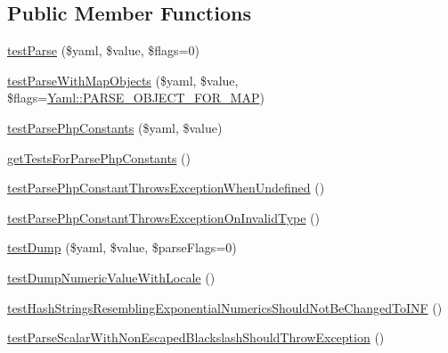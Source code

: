 \subsection*{Public Member Functions}
\begin{DoxyCompactItemize}
\item 
\mbox{\hyperlink{class_symfony_1_1_component_1_1_yaml_1_1_tests_1_1_inline_test_ae32a4636dc7d2dda4a5d4baa0b205292}{test\+Parse}} (\$yaml, \$value, \$flags=0)
\item 
\mbox{\hyperlink{class_symfony_1_1_component_1_1_yaml_1_1_tests_1_1_inline_test_a441ba08e95d784de90a90af091c5c3ba}{test\+Parse\+With\+Map\+Objects}} (\$yaml, \$value, \$flags=\mbox{\hyperlink{class_symfony_1_1_component_1_1_yaml_1_1_yaml_a570a6d9877bcb0c9eaffeb0f046e04b0}{Yaml\+::\+P\+A\+R\+S\+E\+\_\+\+O\+B\+J\+E\+C\+T\+\_\+\+F\+O\+R\+\_\+\+M\+AP}})
\item 
\mbox{\hyperlink{class_symfony_1_1_component_1_1_yaml_1_1_tests_1_1_inline_test_ae6e0682eb91d703b45b24ea4e1bef07c}{test\+Parse\+Php\+Constants}} (\$yaml, \$value)
\item 
\mbox{\hyperlink{class_symfony_1_1_component_1_1_yaml_1_1_tests_1_1_inline_test_a06b6e4fc4d95ccdc8c4cb011d243bfd2}{get\+Tests\+For\+Parse\+Php\+Constants}} ()
\item 
\mbox{\hyperlink{class_symfony_1_1_component_1_1_yaml_1_1_tests_1_1_inline_test_ab3438ff7f27e3e28a411ca3cf7d8bbc8}{test\+Parse\+Php\+Constant\+Throws\+Exception\+When\+Undefined}} ()
\item 
\mbox{\hyperlink{class_symfony_1_1_component_1_1_yaml_1_1_tests_1_1_inline_test_ad283e6b07d6a2c61da0384654c2ec84d}{test\+Parse\+Php\+Constant\+Throws\+Exception\+On\+Invalid\+Type}} ()
\item 
\mbox{\hyperlink{class_symfony_1_1_component_1_1_yaml_1_1_tests_1_1_inline_test_a5947b1b8c15f1f19028f02d1da7bf76d}{test\+Dump}} (\$yaml, \$value, \$parse\+Flags=0)
\item 
\mbox{\hyperlink{class_symfony_1_1_component_1_1_yaml_1_1_tests_1_1_inline_test_a96cb5dde19e80674e44f6d976dc8b3db}{test\+Dump\+Numeric\+Value\+With\+Locale}} ()
\item 
\mbox{\hyperlink{class_symfony_1_1_component_1_1_yaml_1_1_tests_1_1_inline_test_add0340153c5cb0257b52b38141216a2b}{test\+Hash\+Strings\+Resembling\+Exponential\+Numerics\+Should\+Not\+Be\+Changed\+To\+I\+NF}} ()
\item 
\mbox{\hyperlink{class_symfony_1_1_component_1_1_yaml_1_1_tests_1_1_inline_test_a08d68bf6daeaf14da1d7a34784e5885d}{test\+Parse\+Scalar\+With\+Non\+Escaped\+Blackslash\+Should\+Throw\+Exception}} ()

\end{DoxyCompactItemize}
